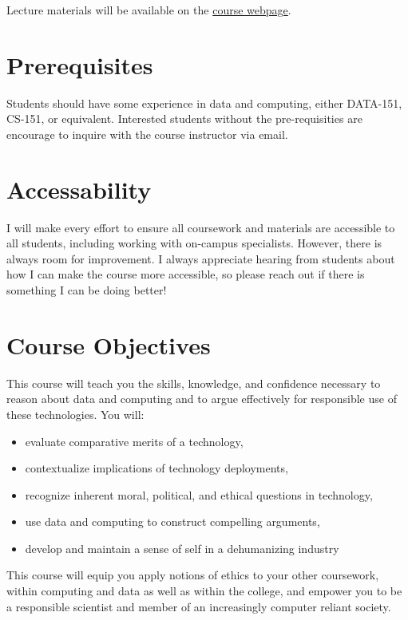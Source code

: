 \documentclass[11pt]{article}
\begin{document}
Lecture materials will be available on the \href{https://cd-public.github.io/courses/eths24}{course webpage}.



\section*{Prerequisites}

Students should have some experience in data and computing, either DATA-151, CS-151, or equivalent. Interested students without the pre-requisities are encourage to inquire with the course instructor via email.

\section*{Accessability}

I will make every effort to ensure all coursework and materials are accessible to all students, including working with on-campus specialists. However, there is always room for improvement. I always appreciate hearing from students about how I can make the course more accessible, so please reach out if there is something I can be doing better!


\section*{Course Objectives}
This course will teach you the skills, knowledge, and confidence necessary to reason about data and computing and to argue effectively for responsible use of these technologies. You will:
\begin{itemize}
\item    evaluate comparative merits of a technology,
\item    contextualize implications of technology deployments,
\item    recognize inherent moral, political, and ethical questions in technology,
\item    use data and computing to construct compelling arguments,
\item    develop and maintain a sense of self in a dehumanizing industry
\end{itemize}
This course will equip you apply notions of ethics to your other coursework, within computing and data as well as within the college, and empower you to be a responsible scientist and member of an increasingly computer reliant society.
\end{document}
